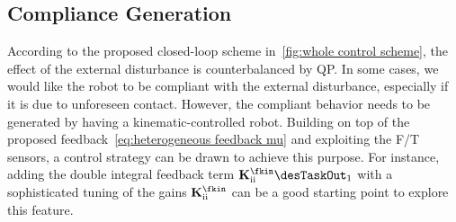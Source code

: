 		\subsection*{Compliance Generation} According to the proposed closed-loop scheme in~\cref{fig:whole control scheme}, the effect of the external disturbance is counterbalanced by QP. In some cases,  we would like the robot to be compliant with the external disturbance, especially if it is due to unforeseen contact. However, the compliant behavior needs to be generated by having a kinematic-controlled robot. Building on top of the proposed feedback~\cref{eq:heterogeneous feedback mu} and exploiting the  F/T sensors, a control strategy can be drawn to achieve this purpose. For instance, adding the double integral feedback term $\mathbf{K}^{\fkin}_{\rm ii}\desTaskOut_1$ with a sophisticated tuning of the gains $\mathbf{K}^{\fkin}_{\rm ii}$ can be a good starting point to explore this feature. 
